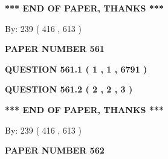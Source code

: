 \documentclass[12pt]{article}
\begin{document}
  
   
   
 \vspace{0.2in}
 
   
   
   
   
\vspace{1.0in} 
{\textbf{\large{ *** END OF PAPER, THANKS *** }}} 
   
   
\hspace{1.0in} By: 
 239 ( 416 ,  613 )
   
   
   
   
\newpage 
\setcounter{page}{ 
   561001 } 
   
   
   
   
 {\textbf{ \Large{ PAPER NUMBER  561  }}}
   
   
\vspace{0.2in}
   
   
   
   
   
   
 \vspace{0.2in}
 
 
 
 
   
   
  
\vspace{0.2in}
  
{\textbf{\Large{QUESTION
561.1 
 ( 1 , 1 , 6791 )
}}}
  
  
  
\vspace{0.2in}
  
{\textbf{\Large{QUESTION
561.2 
 ( 2 , 2 , 3 )
}}}
  
  
   
   
 \vspace{0.2in}
 
   
   
   
   
\vspace{1.0in} 
{\textbf{\large{ *** END OF PAPER, THANKS *** }}} 
   
   
\hspace{1.0in} By: 
 239 ( 416 ,  613 )
   
   
   
   
\newpage 
\setcounter{page}{ 
   562001 } 
   
   
   
   
 {\textbf{ \Large{ PAPER NUMBER  562  }}}
   
\end{document}
